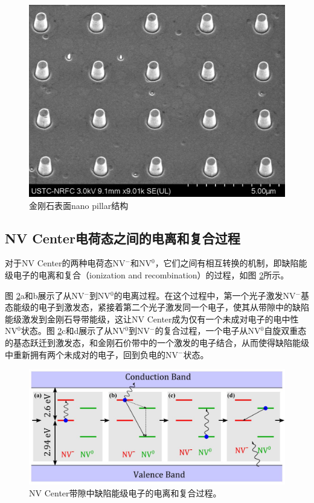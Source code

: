 \documentclass[type = bachelor]{whu-thesis}
\begin{document}
\begin{figure}
  \centering
  \includegraphics[width=1.0\textwidth]{figures/Chapter 2/nano pillar.png}
  \caption[金刚石表面nano pillar结构]{金刚石表面nano pillar结构}
  \label{fig: nano pillar}
\end{figure}

\subsection{NV Center电荷态之间的电离和复合过程}
对于NV Center的两种电荷态NV$^-$和NV$^0$，它们之间有相互转换的机制，即缺陷能级电子的电离和复合（ionization and recombination）的过程，如图 \ref{fig: Ionization and Recombination}所示。

图 \ref{fig: Ionization and Recombination}a和b展示了从NV$^-$到NV$^0$的电离过程。在这个过程中，第一个光子激发NV$^-$基态能级的电子到激发态，紧接着第二个光子激发同一个电子，使其从带隙中的缺陷能级激发到金刚石导带能级，这让NV Center成为仅有一个未成对电子的电中性NV$^0$状态。图 \ref{fig: Ionization and Recombination}c和d展示了从NV$^0$到NV$^-$的复合过程，一个电子从NV$^0$自旋双重态的基态跃迁到激发态，和金刚石价带中的一个激发的电子结合，从而使得缺陷能级中重新拥有两个未成对的电子，回到负电的NV$^-$状态。

\begin{figure}
  \centering
  \includegraphics[width=1.0\textwidth]{figures/Chapter 2/Ionization and Recombination.png}
  \caption[NV Center带隙中缺陷能级电子的电离和复合过程]{NV Center带隙中缺陷能级电子的电离和复合过程\cite{aslam2013photo}。}
  \label{fig: Ionization and Recombination}
\end{figure}
\end{document}
